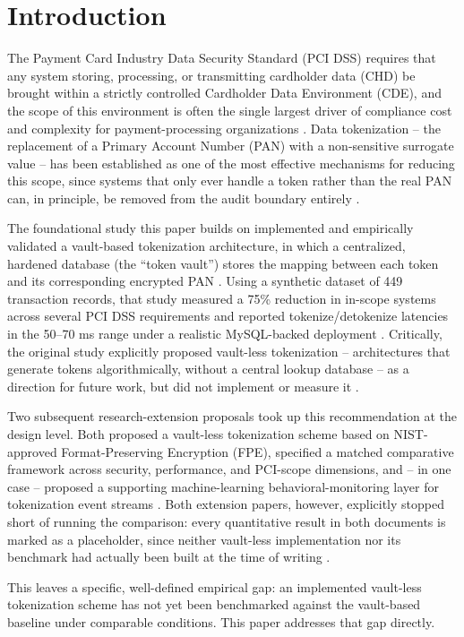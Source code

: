\documentclass[conference]{IEEEtran}
\begin{document}
\section{Introduction}
The Payment Card Industry Data Security Standard (PCI DSS) requires that any system storing, processing, or transmitting cardholder data (CHD) be brought within a strictly controlled Cardholder Data Environment (CDE), and the scope of this environment is often the single largest driver of compliance cost and complexity for payment-processing organizations \cite{b1}. Data tokenization -- the replacement of a Primary Account Number (PAN) with a non-sensitive surrogate value -- has been established as one of the most effective mechanisms for reducing this scope, since systems that only ever handle a token rather than the real PAN can, in principle, be removed from the audit boundary entirely \cite{b1}.

The foundational study this paper builds on implemented and empirically validated a vault-based tokenization architecture, in which a centralized, hardened database (the ``token vault'') stores the mapping between each token and its corresponding encrypted PAN \cite{b1}. Using a synthetic dataset of 449 transaction records, that study measured a 75\% reduction in in-scope systems across several PCI DSS requirements and reported tokenize/detokenize latencies in the 50--70 ms range under a realistic MySQL-backed deployment \cite{b1}. Critically, the original study explicitly proposed vault-less tokenization -- architectures that generate tokens algorithmically, without a central lookup database -- as a direction for future work, but did not implement or measure it \cite{b1}.

Two subsequent research-extension proposals took up this recommendation at the design level. Both proposed a vault-less tokenization scheme based on NIST-approved Format-Preserving Encryption (FPE), specified a matched comparative framework across security, performance, and PCI-scope dimensions, and -- in one case -- proposed a supporting machine-learning behavioral-monitoring layer for tokenization event streams \cite{b2,b3}. Both extension papers, however, explicitly stopped short of running the comparison: every quantitative result in both documents is marked as a placeholder, since neither vault-less implementation nor its benchmark had actually been built at the time of writing \cite{b2,b3}.

This leaves a specific, well-defined empirical gap: an implemented vault-less tokenization scheme has not yet been benchmarked against the vault-based baseline under comparable conditions. This paper addresses that gap directly.
\end{document}
